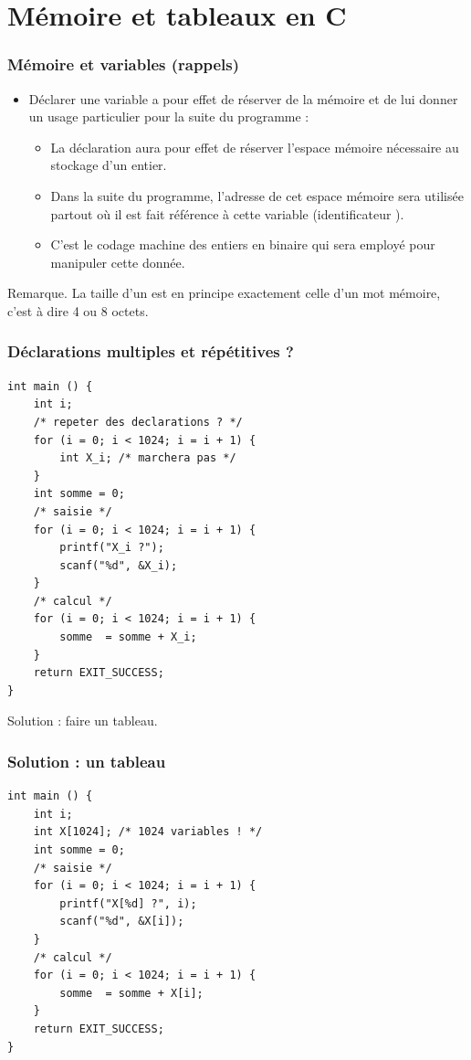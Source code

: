 \documentclass[xcolor=pdftex,svgnames,table]{beamer}
\begin{document}
\section[Tableaux en C]{Mémoire et tableaux en C}
\begin{frame}
  \frametitle{Mémoire et variables (rappels)\nowrite}
  \begin{itemize}
  \item Déclarer une variable a pour effet de réserver de la mémoire
    et de lui donner un usage particulier pour la suite du
    programme :\pause
    \begin{itemize}
    \item La déclaration  aura pour effet de réserver l'espace mémoire nécessaire au stockage d'un entier.
\pause
\item  Dans la suite du programme, l'adresse de cet espace mémoire sera utilisée partout où il est fait référence à cette variable (identificateur ).
\pause
\item C'est le codage machine des entiers en binaire qui sera employé pour manipuler cette donnée.
   \end{itemize}\pause
  \end{itemize}
  \begin{block}{Remarque.}
    La  taille d'un  est en principe exactement celle d'un mot
    mémoire, c'est à dire 4 ou 8 octets.
\end{block}
\end{frame}

\begin{frame}[fragile]
  \frametitle{Déclarations multiples et répétitives ?}
  \begin{lstlisting}
int main () {
    int i;
    /* repeter des declarations ? */
    for (i = 0; i < 1024; i = i + 1) {
        int X_i; /* marchera pas */
    }
    int somme = 0;
    /* saisie */
    for (i = 0; i < 1024; i = i + 1) {
        printf("X_i ?");
        scanf("%d", &X_i);
    }
    /* calcul */
    for (i = 0; i < 1024; i = i + 1) {
        somme  = somme + X_i;
    }
    return EXIT_SUCCESS;
}
  \end{lstlisting}
\pause
Solution : faire un tableau.
\end{frame}

\begin{frame}[fragile]
\frametitle{Solution : un tableau}
  \begin{lstlisting}
int main () {
    int i;
    int X[1024]; /* 1024 variables ! */
    int somme = 0;
    /* saisie */
    for (i = 0; i < 1024; i = i + 1) {
        printf("X[%d] ?", i);
        scanf("%d", &X[i]);
    }
    /* calcul */
    for (i = 0; i < 1024; i = i + 1) {
        somme  = somme + X[i];
    }
    return EXIT_SUCCESS;
}
  \end{lstlisting}
\end{frame}
\end{document}
